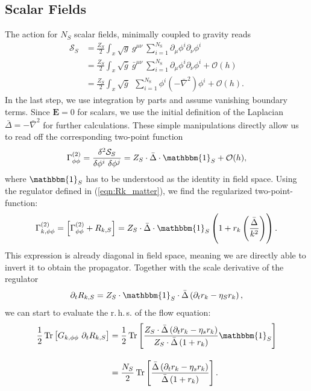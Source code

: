 \subsection{Scalar Fields}
The action for $N_S$ scalar fields, minimally coupled to gravity reads
\begin{align}
	\mathcal{S}_S &= \frac{Z_{S}}{2}\int_x \sqrt{g} \ g^{\mu\nu} \ \sum\limits_{i=1}^{N_{\text{S}}} \partial_{\mu}\phi^{i}\partial_{\nu}\phi^{i} \nonumber \\
&=  \frac{Z_{S}}{2}\int_x \sqrt{\bar{g}} \ \bar{g}^{\mu\nu} \ \sum\limits_{i=1}^{N_{\text{S}}} \partial_{\mu}\phi^{i}\partial_{\nu}\phi^{i} + \mathcal{O}(h) \\
&= \frac{Z_{S}}{2}\int_x \sqrt{\bar{g}} \ \ \sum\limits_{i=1}^{N_{\text{S}}} \phi^{i}\left(-\bar{\nabla}^2\right)\phi^{i} + \mathcal{O}(h). \nonumber
\end{align}
In the last step, we use integration by parts and assume vanishing boundary terms. Since $\mathbf{E} =0$ for scalars, we use the initial definition of the Laplacian $\bar{\Delta} = -\bar{\nabla}^2$ for further calculations. These simple manipulations directly allow us to read off the corresponding two-point function
\begin{align}
	\Gamma^{(2)}_{\phi\phi} = \frac{\delta^2 \mathcal{S}_S}{\delta\phi^{i}\ \delta\phi^{j}} = Z_S \cdot\bar{\Delta}\cdot\mathbbm{1}_S + \mathcal{O}(h),
\end{align}
where $\mathbbm{1}_S$ has to be understood as the identity in field space. Using the regulator defined in (\ref{eqn:Rk_matter}), we find the regularized two-point-function:
\begin{align}
	\Gamma^{(2)}_{k, \phi\phi} = \left[\Gamma^{(2)}_{\phi\phi}+ R_{k, S}\right]  = Z_S \cdot\bar{\Delta}\cdot\mathbbm{1}_S\left(1 + r_k\left(\frac{\bar{\Delta}}{k^2}\right)\right).
\end{align}
This expression is already diagonal in field space, meaning we are directly able to invert it to obtain the propagator. Together with the scale derivative of the regulator
\begin{align}
	\partial_t R_{k, S} = Z_S\cdot\mathbbm{1}_S\cdot\bar{\Delta}\left(\partial_t r_k - \eta_S r_k\right),
\end{align}
we can start to evaluate the r.\,h.\,s. of the flow equation:
\begin{equation}
\begin{aligned}
	\frac{1}{2}\tr{G_{k,\phi\phi}\ \partial_t R_{k,S}} &= \frac{1}{2}\tr{\frac{Z_S\cdot\bar{\Delta}\left(\partial_t r_k - \eta_s r_k\right)}{Z_S \cdot\bar{\Delta}\left(1 + r_k\right)}\mathbbm{1}_S}\\[10pt]
	&=   \frac{N_S}{2}\tr{\frac{\bar{\Delta}\left(\partial_t r_k - \eta_s r_k\right)}{\bar{\Delta}\left(1 + r_k\right)}}. 
\end{aligned}
\end{equation}

